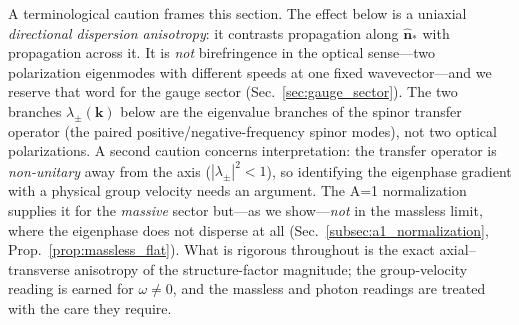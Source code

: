 %

\label{sec:kinematic_channel}

A terminological caution frames this section. The effect below is a uniaxial
\emph{directional dispersion anisotropy}: it contrasts propagation along
$\hat{\mathbf{n}}_*$ with propagation across it. It is \emph{not} birefringence in
the optical sense---two polarization eigenmodes with different speeds at one fixed
wavevector---and we reserve that word for the gauge sector
(Sec.~\ref{sec:gauge_sector}). The two branches $\lambda_\pm(\mathbf{k})$ below are
the eigenvalue branches of the spinor transfer operator (the paired
positive/negative-frequency spinor modes), not two optical polarizations. A second
caution concerns interpretation: the transfer operator is \emph{non-unitary} away
from the axis ($|\lambda_\pm|^2<1$), so identifying the eigenphase gradient with a
physical group velocity needs an argument. The A=1 normalization supplies it for the
\emph{massive} sector but---as we show---\emph{not} in the massless limit, where the
eigenphase does not disperse at all (Sec.~\ref{subsec:a1_normalization},
Prop.~\ref{prop:massless_flat}). What is rigorous throughout is the exact
axial--transverse anisotropy of the structure-factor magnitude; the group-velocity
reading is earned for $\omega\neq0$, and the massless and photon readings are treated
with the care they require.

